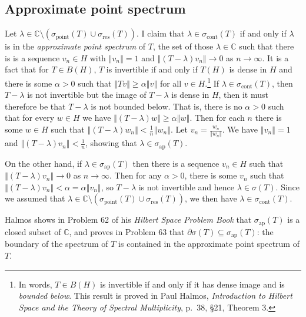 \documentclass{article}
\newcommand{\point}{\sigma_{\textrm{point}}}
\newcommand{\ap}{\sigma_{\textrm{ap}}}
\newcommand{\cont}{\sigma_{\textrm{cont}}}
\newcommand{\residual}{\sigma_{\textrm{res}}}
\newcommand{\norm}[1]{\left\Vert #1 \right\Vert}
\begin{document}
\subsection{Approximate point spectrum}
Let $\lambda \in \mathbb{C} \setminus (\point(T) \cup \residual(T))$. I claim that $\lambda \in \cont(T)$  if and only if $\lambda$ is in the {\em approximate
point spectrum} of $T$, the set of those $\lambda \in \mathbb{C}$ such that there is
is a sequence
$v_n \in H$ with  $\norm{v_n}=1$ and $\norm{(T-\lambda)v_n} \to 0$ as $n \to \infty$.
It is a fact that for $T \in B(H)$,
$T$ is invertible if and only if $T(H)$ is dense in $H$ and there is some $\alpha>0$ such that $\norm{Tv} \geq \alpha \norm{v}$ for all $v \in H$.\footnote{In words,
$T \in B(H)$ is invertible if and only if it has dense image and is {\em bounded below}. This result is proved
in Paul Halmos, {\em Introduction to Hilbert Space and the Theory
of Spectral Multiplicity}, p.~38, \S 21, Theorem 3.} If $\lambda 
\in \cont(T)$, then $T-\lambda$ is not invertible but the image of $T-\lambda$ is dense in $H$, then it must therefore be that
$T-\lambda$ is not bounded below. That is, there is no $\alpha>0$ such that for every $w \in H$ we have $\norm{(T-\lambda)w} \geq \alpha \norm{w}$.
Then for each $n$ there is some $w \in H$ such that $\norm{(T-\lambda)w_n} < \frac{1}{n} \norm{w_n}$. Let $v_n=\frac{w_n}{\norm{w_n}}$. We  have
$\norm{v_n}=1$ and $\norm{(T-\lambda)v_n}<\frac{1}{n}$, showing that $\lambda \in \ap(T)$.

On the other hand, if $\lambda \in \ap(T)$ then  there is a sequence $v_n \in H$ such that $\norm{(T-\lambda)v_n} \to 0$ as $n \to \infty$. Then for any $\alpha>0$, there is some $v_n$ such that
$\norm{(T-\lambda)v_n}<\alpha=\alpha \norm{v_n}$, so $T-\lambda$ is not invertible and hence $\lambda \in \sigma(T)$. Since we assumed that
$\lambda \in \mathbb{C} \setminus (\point(T) \cup \residual(T))$, we then have $\lambda \in \cont(T)$.

Halmos shows in Problem 62 of his {\em Hilbert Space Problem Book} that
$\ap(T)$ is a closed subset of $\mathbb{C}$, and proves in Problem 63 that $\partial \sigma(T) \subseteq \ap(T)$: the boundary of the spectrum of $T$
is contained in the approximate point spectrum of $T$.
\end{document}
